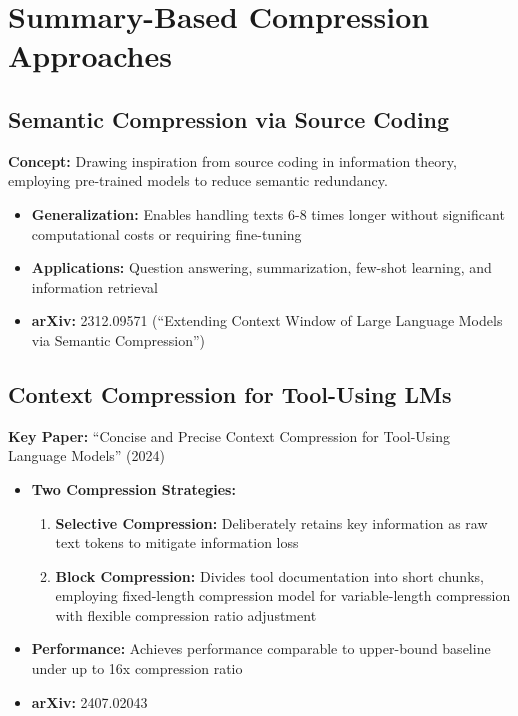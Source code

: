 \documentclass[11pt]{article}
\begin{document}
\section{Summary-Based Compression Approaches}

\subsection{Semantic Compression via Source Coding}

\textbf{Concept:} Drawing inspiration from source coding in information theory, employing pre-trained models to reduce semantic redundancy.

\begin{itemize}[leftmargin=*]
    \item \textbf{Generalization:} Enables handling texts 6-8 times longer without significant computational costs or requiring fine-tuning
    \item \textbf{Applications:} Question answering, summarization, few-shot learning, and information retrieval
    \item \textbf{arXiv:} 2312.09571 (``Extending Context Window of Large Language Models via Semantic Compression'')
\end{itemize}

\subsection{Context Compression for Tool-Using LMs}

\textbf{Key Paper:} ``Concise and Precise Context Compression for Tool-Using Language Models'' (2024)

\begin{itemize}[leftmargin=*]
    \item \textbf{Two Compression Strategies:}
    \begin{enumerate}
        \item \textbf{Selective Compression:} Deliberately retains key information as raw text tokens to mitigate information loss
        \item \textbf{Block Compression:} Divides tool documentation into short chunks, employing fixed-length compression model for variable-length compression with flexible compression ratio adjustment
    \end{enumerate}
    \item \textbf{Performance:} Achieves performance comparable to upper-bound baseline under up to 16x compression ratio
    \item \textbf{arXiv:} 2407.02043
\end{itemize}
\end{document}
